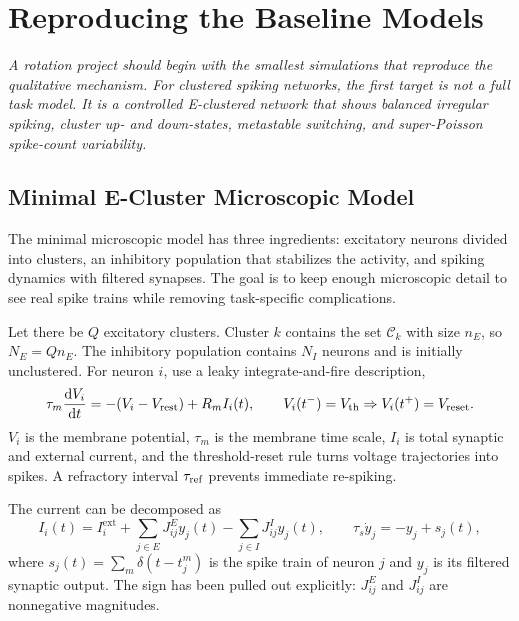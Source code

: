 \chapter{Reproducing the Baseline Models}
\label{ch:reproducing-baselines}

\textit{A rotation project should begin with the smallest simulations that reproduce the qualitative mechanism. For clustered spiking networks, the first target is not a full task model. It is a controlled E-clustered network that shows balanced irregular spiking, cluster up- and down-states, metastable switching, and super-Poisson spike-count variability.}

\section{Minimal E-Cluster Microscopic Model}
\label{sec:minimal-e-cluster-microscopic-model}

The minimal microscopic model has three ingredients: excitatory neurons divided into clusters, an inhibitory population that stabilizes the activity, and spiking dynamics with filtered synapses. The goal is to keep enough microscopic detail to see real spike trains while removing task-specific complications.

Let there be $Q$ excitatory clusters. Cluster $k$ contains the set $\mathcal{C}_k$ with size $n_E$, so $N_E=Qn_E$. The inhibitory population contains $N_I$ neurons and is initially unclustered. For neuron $i$, use a leaky integrate-and-fire description,
%
\begin{equation}
  \tau_m \frac{\mathop{}\!\mathrm{d} V_i}{\mathop{}\!\mathrm{d} t}
  =
  -(V_i-V_{\text{rest}})
  +
  R_m I_i(t),
  \qquad
  V_i(t^-)=V_{\text{th}} \Rightarrow V_i(t^+)=V_{\text{reset}} .
  \label{eq:baseline-lif}
\end{equation}
%
$V_i$ is the membrane potential, $\tau_m$ is the membrane time scale, $I_i$ is total synaptic and external current, and the threshold-reset rule turns voltage trajectories into spikes. A refractory interval $\tau_{\text{ref}}$ prevents immediate re-spiking.

The current can be decomposed as
%
\begin{equation}
  I_i(t)
  =
  I_i^{\mathrm{ext}}
  +
  \sum_{j\in E} J_{ij}^{E} y_j(t)
  -
  \sum_{j\in I} J_{ij}^{I} y_j(t),
  \qquad
  \tau_s \dot y_j=-y_j+s_j(t),
  \label{eq:baseline-synaptic-current}
\end{equation}
%
where $s_j(t)=\sum_m\delta(t-t_j^m)$ is the spike train of neuron $j$ and $y_j$ is its filtered synaptic output. The sign has been pulled out explicitly: $J_{ij}^E$ and $J_{ij}^I$ are nonnegative magnitudes.

